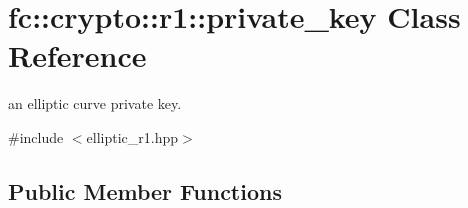 \hypertarget{classfc_1_1crypto_1_1r1_1_1private__key}{}\section{fc\+:\+:crypto\+:\+:r1\+:\+:private\+\_\+key Class Reference}
\label{classfc_1_1crypto_1_1r1_1_1private__key}


an elliptic curve private key.  




{\ttfamily \#include $<$elliptic\+\_\+r1.\+hpp$>$}

\subsection*{Public Member Functions}

